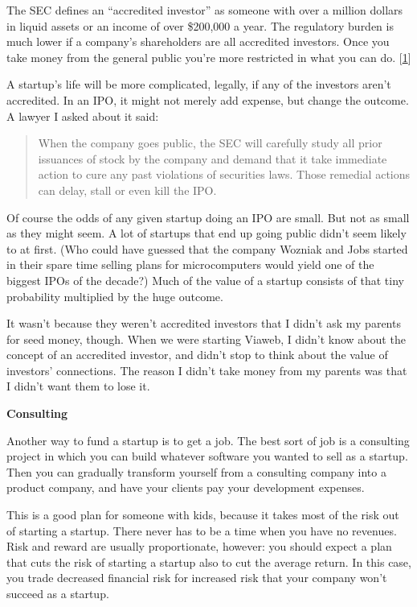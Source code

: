 The SEC defines an ``accredited investor'' as someone with over a
million dollars in liquid assets or an income of over \$200,000 a year.
The regulatory burden is much lower if a company's shareholders are all
accredited investors. Once you take money from the general public you're
more restricted in what you can do. {[}\hyperref[f1n]{1}{]}

A startup's life will be more complicated, legally, if any of the
investors aren't accredited. In an IPO, it might not merely add expense,
but change the outcome. A lawyer I asked about it said:

\begin{quote}
When the company goes public, the SEC will carefully study all prior
issuances of stock by the company and demand that it take immediate
action to cure any past violations of securities laws. Those remedial
actions can delay, stall or even kill the IPO.
\end{quote}

Of course the odds of any given startup doing an IPO are small. But not
as small as they might seem. A lot of startups that end up going public
didn't seem likely to at first. (Who could have guessed that the company
Wozniak and Jobs started in their spare time selling plans for
microcomputers would yield one of the biggest IPOs of the decade?) Much
of the value of a startup consists of that tiny probability multiplied
by the huge outcome.

It wasn't because they weren't accredited investors that I didn't ask my
parents for seed money, though. When we were starting Viaweb, I didn't
know about the concept of an accredited investor, and didn't stop to
think about the value of investors' connections. The reason I didn't
take money from my parents was that I didn't want them to lose it.

\textbf{Consulting}

Another way to fund a startup is to get a job. The best sort of job is a
consulting project in which you can build whatever software you wanted
to sell as a startup. Then you can gradually transform yourself from a
consulting company into a product company, and have your clients pay
your development expenses.

This is a good plan for someone with kids, because it takes most of the
risk out of starting a startup. There never has to be a time when you
have no revenues. Risk and reward are usually proportionate, however:
you should expect a plan that cuts the risk of starting a startup also
to cut the average return. In this case, you trade decreased financial
risk for increased risk that your company won't succeed as a startup.

